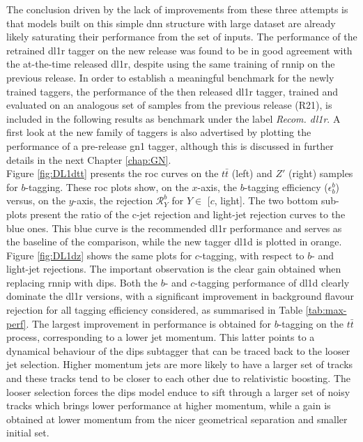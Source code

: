 The conclusion driven by the lack of improvements from these three attempts is that models built on this simple \gls{dnn} structure with large dataset are already likely saturating their performance from the set of inputs. The performance of the retrained \gls{dl1r} tagger on the new release was found to be in good agreement with the at-the-time released \gls{dl1r}, despite using the same training of \gls{rnnip} on the previous release. In order to establish a meaningful benchmark for the newly trained taggers, the performance of the then released \gls{dl1r} tagger, trained and evaluated on an analogous set of samples from the previous release (R21), is included in the following results as benchmark under the label \textit{Recom. \gls{dl1r}}. A first look at the new family of taggers is also advertised by plotting the performance of a pre-release \gls{gn1} tagger, although this is discussed in further details in the next Chapter \ref{chap:GN}. \\

Figure \ref{fig:DL1dtt} presents the \gls{roc} curves on the $t\bar{t}$ (left) and $Z'$ (right) samples for $b$-tagging. These \gls{roc} plots show, on the $x$-axis, the $b$-tagging efficiency ($\epsilon^b_b$) versus, on the $y$-axis, the rejection $\mathcal{R}^b_Y$ for $Y \in$ [$c$, light]. The two bottom sub-plots present the ratio of the c-jet rejection and light-jet rejection curves to the blue ones. This blue curve is the recommended \gls{dl1r} performance and serves as the baseline of the comparison, while the new tagger \gls{dl1d} is plotted in orange. Figure \ref{fig:DL1dz} shows the same plots for $c$-tagging, with respect to $b$- and light-jet rejections. The important observation is the clear gain obtained when replacing \gls{rnnip} with \gls{dips}. Both the $b$- and $c$-tagging performance of \gls{dl1d} clearly dominate the \gls{dl1r} versions, with a significant improvement in background flavour rejection for all tagging efficiency considered, as summarised in Table \ref{tab:max-perf}. The largest improvement in performance is obtained for $b$-tagging on the $t\bar{t}$ process, corresponding to a lower jet momentum. This latter points to a dynamical behaviour of the \gls{dips} subtagger that can be traced back to the looser jet selection. Higher momentum jets are more likely to have a larger set of tracks and these tracks tend to be closer to each other due to relativistic boosting. The looser selection forces the \gls{dips} model enduce to sift through a larger set of noisy tracks which brings lower performance at higher momentum, while a gain is obtained at lower momentum from the nicer geometrical separation and smaller initial set.  \\

